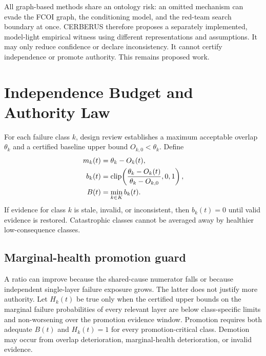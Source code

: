 All graph-based methods share an ontology risk: an omitted mechanism can evade the FCOI graph, the conditioning model, and the red-team search boundary at once. CERBERUS therefore proposes a separately implemented, model-light empirical witness using different representations and assumptions. It may only reduce confidence or declare inconsistency. It cannot certify independence or promote authority. This remains proposed work.

\section{Independence Budget and Authority Law}
For each failure class $k$, design review establishes a maximum acceptable overlap $\theta_k$ and a certified baseline upper bound $O_{k,0}<\theta_k$. Define
\begin{align}
m_k(t) &= \theta_k-O_k(t),\\
b_k(t) &= \operatorname{clip}\!\left(
\frac{\theta_k-O_k(t)}{\theta_k-O_{k,0}},0,1\right),\\
B(t) &= \min_{k\in K} b_k(t).
\label{eq:budget}
\end{align}
If evidence for class $k$ is stale, invalid, or inconsistent, then $b_k(t)=0$ until valid evidence is restored. Catastrophic classes cannot be averaged away by healthier low-consequence classes.

\subsection{Marginal-health promotion guard}
A ratio can improve because the shared-cause numerator falls or because independent single-layer failure exposure grows. The latter does not justify more authority. Let $H_k(t)$ be true only when the certified upper bounds on the marginal failure probabilities of every relevant layer are below class-specific limits and non-worsening over the promotion evidence window. Promotion requires both adequate $B(t)$ and $H_k(t)=1$ for every promotion-critical class. Demotion may occur from overlap deterioration, marginal-health deterioration, or invalid evidence.


